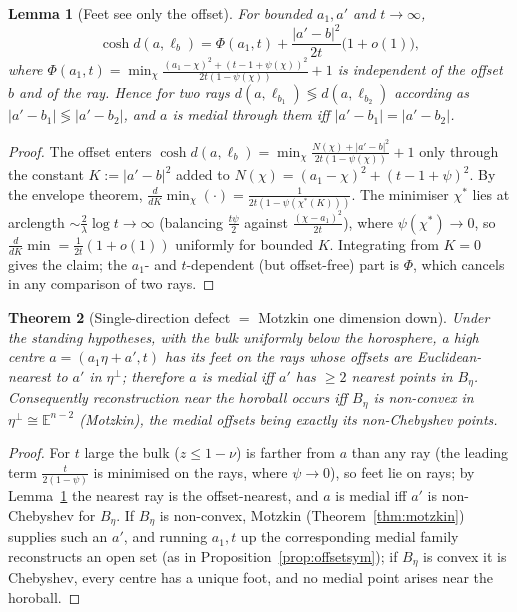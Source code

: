 \documentclass[11pt]{article}
\newtheorem{theorem}{Theorem}[section]
\newtheorem{lemma}[theorem]{Lemma}
\theoremstyle{remark}
\begin{document}
\begin{lemma}[Feet see only the offset]\label{lem:footoffset}
For bounded $a_{1},a'$ and $t\to\infty$,
\[
\cosh d(a,\ell_{b})=\Phi(a_{1},t)+\frac{\lvert a'-b\rvert^{2}}{2t}
\bigl(1+o(1)\bigr),
\]
where $\Phi(a_{1},t)=\min_{\chi}\frac{(a_{1}-\chi)^{2}+(t-1+\psi(\chi))
^{2}}{2t(1-\psi(\chi))}+1$ is independent of the offset $b$ and of the
ray. Hence for two rays $d(a,\ell_{b_{1}})\lessgtr d(a,\ell_{b_{2}})$
according as $\lvert a'-b_{1}\rvert\lessgtr\lvert a'-b_{2}\rvert$, and
$a$ is medial through them iff $\lvert a'-b_{1}\rvert=\lvert a'-b_{2}
\rvert$.
\end{lemma}

\begin{proof}
The offset enters $\cosh d(a,\ell_{b})=\min_{\chi}\frac{N(\chi)+\lvert
a'-b\rvert^{2}}{2t(1-\psi(\chi))}+1$ only through the constant
$K:=\lvert a'-b\rvert^{2}$ added to $N(\chi)=(a_{1}-\chi)^{2}+(t-1+
\psi)^{2}$. By the envelope theorem,
$\frac{d}{dK}\min_{\chi}(\cdot)=\frac{1}{2t(1-\psi(\chi^{\ast}(K)))}$.
The minimiser $\chi^{\ast}$ lies at arclength $\sim\frac{2}{\lambda}
\log t\to\infty$ (balancing $\frac{t\psi}{2}$ against
$\frac{(\chi-a_{1})^{2}}{2t}$), where $\psi(\chi^{\ast})\to0$, so
$\frac{d}{dK}\min=\frac{1}{2t}(1+o(1))$ uniformly for bounded $K$.
Integrating from $K=0$ gives the claim; the $a_{1}$- and
$t$-dependent (but offset-free) part is $\Phi$, which cancels in any
comparison of two rays.
\end{proof}

\begin{theorem}[Single-direction defect $=$ Motzkin one dimension down]
\label{thm:onedirection}
Under the standing hypotheses, with the bulk uniformly below the
horosphere, a high centre $a=(a_{1}\eta+a',t)$ has its feet on the rays
whose offsets are Euclidean-nearest to $a'$ in $\eta^{\perp}$;
therefore $a$ is medial iff $a'$ has $\ge2$ nearest points in
$B_{\eta}$. Consequently reconstruction near the horoball occurs iff
$B_{\eta}$ is non-convex in $\eta^{\perp}\cong\mathbb{E}^{n-2}$
(Motzkin), the medial offsets being exactly its non-Chebyshev points.
\end{theorem}

\begin{proof}
For $t$ large the bulk ($z\le1-\nu$) is farther from $a$ than any ray
(the leading term $\frac{t}{2(1-\psi)}$ is minimised on the rays, where
$\psi\to0$), so feet lie on rays; by Lemma~\ref{lem:footoffset} the
nearest ray is the offset-nearest, and $a$ is medial iff $a'$ is
non-Chebyshev for $B_{\eta}$. If $B_{\eta}$ is non-convex, Motzkin
(Theorem~\ref{thm:motzkin}) supplies such an $a'$, and running
$a_{1},t$ up the corresponding medial family reconstructs an open set
(as in Proposition~\ref{prop:offsetsym}); if $B_{\eta}$ is convex it
is Chebyshev, every centre has a unique foot, and no medial point
arises near the horoball.
\end{proof}
\end{document}

